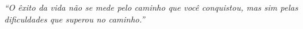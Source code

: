 \thispagestyle{empty}

\vspace*{\fill}
\begin{flushright}
	\begin{minipage}{8cm}
		\textit{
			“O êxito da vida não se mede pelo caminho que você conquistou, mas sim pelas dificuldades que superou no caminho.”
			\\\\
		}
	\end{minipage}
\end{flushright}


